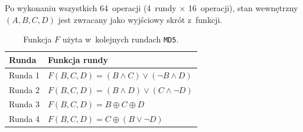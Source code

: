 \begin{myenumerate}
\begin{myenumerate}
\begin{itemize}
\begin{itemize}
            \end{itemize}

        \end{itemize}

    \end{myenumerate}

    \item Po wykonaniu wszystkich 64~operacji (4~rundy $\times$ 16~operacji),
    stan wewnętrzny $(A,B,C,D)$ jest zwracany jako wyjściowy skrót z~funkcji.

\end{myenumerate}

\begin{table}[htb]
    \caption{Funkcja $F$ użyta w~kolejnych rundach \texttt{MD5}.}
    \label{tbl:md5_round_function}
    \begin{tabular}{|l|l|}
        \hline
        Runda & Funkcja rundy \\
        \hline
        Runda 1 &
        $F(B,C,D) = (B \land C) \lor (\lnot B \land D)$ \\

        Runda 2 &
        $F(B,C,D) = (B \land D) \lor (C \land \lnot D)$ \\

        Runda 3 &
        $F(B,C,D) = B \oplus C \oplus D$ \\

        Runda 4 &
        $F(B,C,D) = C \oplus (B \lor \lnot D)$ \\
        \hline
    \end{tabular}
\end{table}

